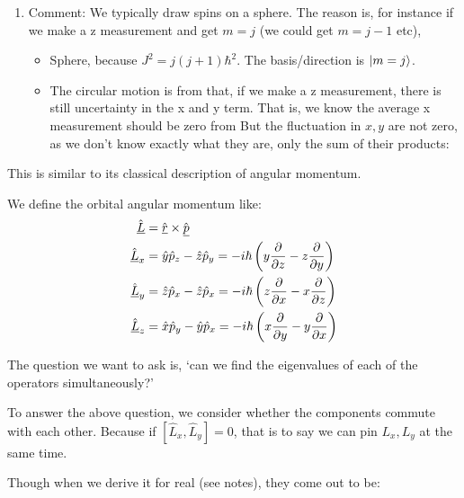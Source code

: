 \documentclass{school-22.101-notes}
\begin{document}
\begin{enumerate}
\begin{enumerate}
  \item Comment: We typically draw spins on a sphere. The reason is,  for instance if we make a z measurement and get $m = j$ (we could get $m = j-1$ etc), 
    \begin{itemize}
      \item Sphere, because $J^2 = j(j+1) \hbar^2$. The basis/direction is $\left| m =j \right>$. 
      \item The circular motion is from that, if we make a z measurement, there is still uncertainty in the x and y term. That is, we know the average x measurement should be zero from 
        But the fluctuation in $x,y$ are not zero, as we don't know exactly what they are, only the sum of their products: 
    \end{itemize}


\end{enumerate}
\end{enumerate}




This is similar to its classical description of angular momentum. 

We define the orbital angular momentum like:
\begin{align}
\hat{\underline{L}} &= \hat{\underline{r}} \times \hat{\underline{p}} \\
\hat{\underline{L}}_x &= \hat{y} \hat{p}_z - \hat{z} \hat{p}_y = - i\hbar \left( y \frac{\partial}{\partial z} - z \frac{\partial}{\partial y} \right) \\
\hat{\underline{L}}_y &= \hat{z} \hat{p}_x - \hat{z} \hat{p}_x = - i\hbar \left( z \frac{\partial}{\partial x} - x \frac{\partial}{\partial z} \right) \\
\hat{\underline{L}}_z &= \hat{x} \hat{p}_y - \hat{y} \hat{p}_x = - i\hbar \left( x \frac{\partial}{\partial y} - y \frac{\partial}{\partial x} \right) 
\end{align}

The question we want to ask is, `can we find the eigenvalues of each of the operators simultaneously?'

To answer the above question, we consider whether the components commute with each other. Because if $\left[ \hat{L}_x, \hat{L}_y \right] = 0$, that is to say we can pin $L_x, L_y$ at the same time. 

Though when we derive it for real (see notes), they come out to be:
\end{document}
